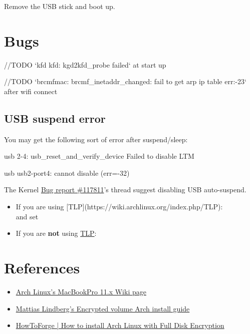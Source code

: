 
Remove the USB stick and boot up.

\section{Bugs}

//TODO `kfd kfd: kgd2kfd\_probe failed` at start up

//TODO `brcmfmac: brcmf\_inetaddr\_changed: fail to get arp ip table err:-23` after wifi connect



\subsection{USB suspend error}

You may get the following sort of error after suspend/sleep:

\begin{codeblock}
	usb 2-4: usb\_reset\_and\_verify\_device Failed to disable LTM
	
	usb usb2-port4: cannot disable (err=-32)
\end{codeblock}

The Kernel \href{https://bugzilla.kernel.org/show_bug.cgi?id=117811}{Bug report \#117811}'s thread suggest disabling USB auto-suspend.

\begin{itemize}[noitemsep,topsep=0pt,leftmargin=*]
	\item If you are using [TLP](https://wiki.archlinux.org/index.php/TLP):\\
	 and set 
	\item If you are \textbf{not} using \href{https://wiki.archlinux.org/index.php/TLP}{TLP}:\\
\end{itemize}



\clearpage
\section{References}

\begin{itemize}
	\item \href{https://wiki.archlinux.org/index.php/MacBookPro11,x#Using_the_MacBook.27s_native_EFI_bootloader_.28recommended.29}{Arch Linux's MacBookPro 11.x Wiki page}
	\item \href{https://gist.github.com/mattiaslundberg/8620837}{Mattias Lindberg's Encrypted volume Arch install guide}
	\item \href{https://www.howtoforge.com/tutorial/how-to-install-arch-linux-with-full-disk-encryption/}{HowToForge | How to install Arch Linux with Full Disk Encryption}
\end{itemize}


